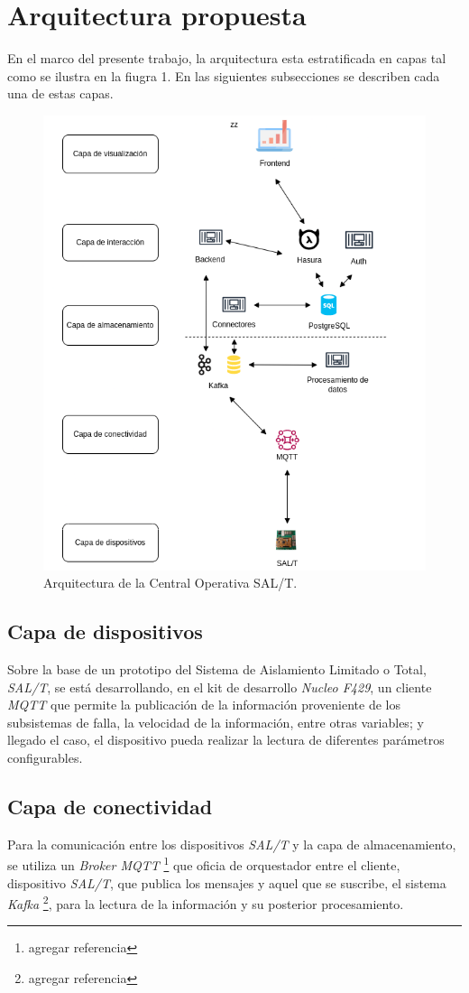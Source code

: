 \documentclass[a4paper]{IEEEtran}
\begin{document}
\section{Arquitectura propuesta}

En el marco del presente trabajo, la arquitectura esta estratificada en capas
tal como se ilustra en la fiugra 1. En las siguientes subsecciones se describen cada una de estas capas.

\begin{figure}[ht]
\centering 
\includegraphics[width=.5\textwidth]{diagram.png}
\caption{Arquitectura de la Central Operativa SAL/T.}
\label{fig:diagBloques}
\end{figure}


\subsection{Capa de dispositivos}

Sobre la base de un prototipo del Sistema de Aislamiento Limitado o Total, \textit{SAL/T}, se está desarrollando, en el kit de desarrollo \textit{Nucleo F429}, un cliente \textit{MQTT} que permite la publicación de la información proveniente de los subsistemas de falla, la velocidad de la información, entre otras variables; y llegado el caso, el dispositivo pueda realizar la lectura de diferentes parámetros configurables.

\subsection{Capa de conectividad}

Para la comunicación entre los dispositivos \textit{SAL/T} y la capa de almacenamiento, se utiliza un \textit{Broker MQTT} \cite{b3} \footnote{agregar referencia} que oficia de orquestador entre el cliente, dispositivo \textit{SAL/T}, que publica los mensajes y aquel que se suscribe, el sistema \textit{Kafka} \cite{b4} \footnote{agregar referencia}, para la lectura de la información y su posterior procesamiento. 
\end{document}
